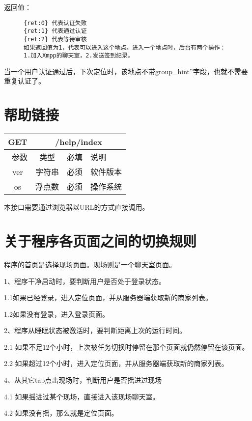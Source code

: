 \documentclass[cs4size]{ctexartutf8}
\begin{document}
返回值：
\begin{figure}[H]
\begin{verbatim}
{ret:0} 代表认证失败
{ret:1} 代表通过认证
{ret:2} 代表等待审核
如果返回值为1，代表可以进入这个地点。进入一个地点时，后台有两个操作：1.加入Xmpp的聊天室，2.发送签到纪录。
\end{verbatim}
\end{figure}

当一个用户认证通过后，下次定位时，该地点不带group\_hint”字段，也就不需要重复认证了。








\section{帮助链接}

\begin{table}[H]
   \begin{center}
\begin{tabular}{|c|c|c|p{12cm}|}
\hline
GET & \multicolumn{3}{|c|}{/help/index} \\
\hline\hline
 \  参数  & 类型 & 必填 &  说明  \\
 \hline
 ver  & 字符串 & 必须 & 软件版本\\
\hline
 os  & 浮点数 & 必须 & 操作系统\\
\hline
\end{tabular}
   \end{center}
\end{table}

本接口需要通过浏览器以URL的方式直接调用。



\section{关于程序各页面之间的切换规则}

程序的首页是选择现场页面。现场则是一个聊天室页面。

1、程序干净启动时，要判断用户是否处于登录状态。

1.1如果已经登录，进入定位页面，并从服务器端获取新的商家列表。

1.2如果没有登录，进入登录页面。


2、程序从睡眠状态被激活时，要判断距离上次的运行时间。

2.1 如果不足12个小时，上次被任务切换时停留在那个页面就仍然停留在该页面。

2.2 如果超过12个小时，进入定位页面，并从服务器端获取新的商家列表。



4、从其它tab点击现场时，判断用户是否摇进过现场

4.1 如果摇进过某个现场，直接进入该现场聊天室。

4.2 如果没有摇，那么就是定位页面。




\newpage
\end{document}
